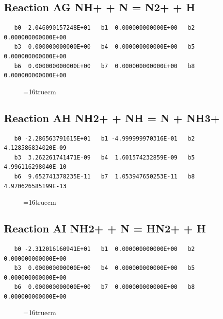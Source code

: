 \documentclass[12pt,dvipdfm]{article}
\begin{document}
\subsection{
Reaction AG NH+ + N = N2+ + H }
\begin{small}\begin{verbatim}
   b0 -2.046090157248E+01   b1  0.000000000000E+00   b2  0.000000000000E+00
   b3  0.000000000000E+00   b4  0.000000000000E+00   b5  0.000000000000E+00
   b6  0.000000000000E+00   b7  0.000000000000E+00   b8  0.000000000000E+00
\end{verbatim}\end{small}
\begin{figure}[h!] \label{n2rates}
\epsfxsize=16truecm
\end{figure}
\newpage

\subsection{
Reaction AH NH2+ + NH = N + NH3+ }
\begin{small}\begin{verbatim}
   b0 -2.286563791615E+01   b1 -4.999999970316E-01   b2  4.128586834020E-09
   b3  3.262261741471E-09   b4  1.601574232859E-09   b5  4.996116298040E-10
   b6  9.652741378235E-11   b7  1.053947650253E-11   b8  4.970626585199E-13
\end{verbatim}\end{small}
\begin{figure}[h!] \label{n2rates}
\epsfxsize=16truecm
\end{figure}
\newpage

\subsection{
Reaction AI NH2+ + N = HN2+ + H }
\begin{small}\begin{verbatim}
   b0 -2.312016160941E+01   b1  0.000000000000E+00   b2  0.000000000000E+00
   b3  0.000000000000E+00   b4  0.000000000000E+00   b5  0.000000000000E+00
   b6  0.000000000000E+00   b7  0.000000000000E+00   b8  0.000000000000E+00
\end{verbatim}\end{small}
\begin{figure}[h!] \label{n2rates}
\epsfxsize=16truecm
\end{figure}
\newpage
\end{document}
